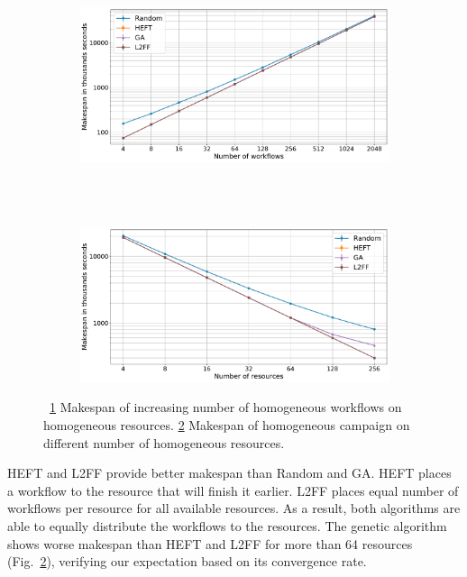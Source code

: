 \begin{figure}[ht!]
    \centering
    \begin{subfigure}[b]{0.75\textwidth}
        \includegraphics[width=.95\textwidth]{figures/campaign/StHomoCampaigns_4StHomoResources.pdf}
        \caption{}
        \label{fig:StHomoCampaigns_4StHomoResources}
    \end{subfigure}\\
    ~
    \begin{subfigure}[b]{0.75\textwidth}
        \includegraphics[width=.95\textwidth]{figures/campaign/StHomoResources_StHomoCampaigns.pdf}
        \caption{}
        \label{fig:StHomoResources_StHomoCampaigns}
    \end{subfigure}
    \caption{~\ref{fig:StHomoCampaigns_4StHomoResources} Makespan of increasing
    number of homogeneous workflows on homogeneous resources.
    \ref{fig:StHomoResources_StHomoCampaigns} Makespan of homogeneous campaign
    on different number of homogeneous resources.}
    \label{fig:st_homog_analysis}
\end{figure}

HEFT and L2FF provide better makespan than Random and GA. HEFT places a workflow
to the resource that will finish it earlier. L2FF places equal number of
workflows per resource for all available resources. As a result, both algorithms
are able to equally distribute the workflows to the resources. The genetic
algorithm shows worse makespan than HEFT and L2FF for more than 64 resources
(Fig.~\ref{fig:StHomoResources_StHomoCampaigns}), verifying our expectation
based on its convergence rate.

